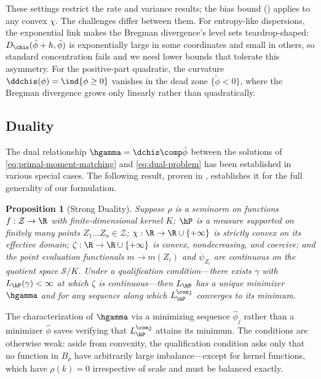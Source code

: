 \documentclass{article}
\newtheorem{proposition}[theorem]{Proposition}
\newcommand{\calS}{\mathcal{S}}
\begin{document}
These settings restrict the rate and variance results;
the bias bound ()
applies to any convex $\chi$.
The challenges differ between them.
For entropy-like dispersions,
the exponential link makes the Bregman divergence's level sets
teardrop-shaped:
$D_{\chis}(\tilde\phi + h, \tilde\phi)$
is exponentially large in some coordinates
and small in others,
so standard concentration fails
and we need lower bounds
that tolerate this asymmetry.
For the positive-part quadratic,
the curvature $\ddchis(\phi) = \ind{\phi \ge 0}$
vanishes in the dead zone $\{\tilde\phi < 0\}$,
where the Bregman divergence grows only linearly
rather than quadratically.

\subsection{Duality}
\label{sec:duality-main}

The dual relationship $\hgamma = \dchis \comp \hat\phi$ between the solutions of \eqref{eq:primal-moment-matching} and \eqref{eq:dual-problem} has been established in various special cases. The following result, proven in , establishes it for the full generality of our formulation.

\begin{proposition}[Strong Duality]
\label{prop:duality}
Suppose $\rho$ is a seminorm on functions $f:\mathcal{Z} \to \R$ with finite-dimensional kernel $K$;
$\hP$ is a measure supported on finitely many points $Z_1 \ldots Z_n \in \mathcal{Z}$; $\chi:\R \to \R \cup \{ +\infty \}$ is strictly convex on its effective domain; $\zeta:\R \to \R \cup \{ +\infty \}$ is convex, nondecreasing, and coercive; and the point evaluation functionals $m \to m(Z_i)$ and $\dot\psi_{Z_i}$ are continuous on the quotient space $\calS/K$. Under a qualification condition---there exists $\gamma$ with $L_{\hP}(\gamma) < \infty$ at which $\zeta$ is continuous---then $L_{\hP}$ has a unique minimizer $\hgamma$ and  for any sequence  along which $L^\conj_{\hP}$ converges to its minimum.
\end{proposition}
The characterization of $\hgamma$ via a minimizing sequence $\hat\phi_j$ rather than a minimizer $\hat\phi$ saves verifying that $L^\conj_{\hP}$ attains its minimum. The conditions are otherwise weak: aside from convexity, the qualification condition asks only that no function in $B_\rho$ have arbitrarily large imbalance---except for kernel functions, which have $\rho(k)=0$ irrespective of scale and must be balanced exactly.
\end{document}
